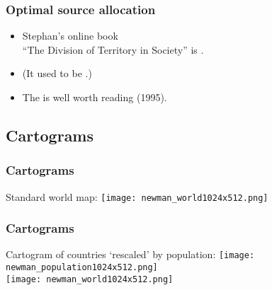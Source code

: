 \begin{frame}
  \frametitle{Optimal source allocation}

  \begin{itemize}
  \item 
    Stephan's online book\\
    \alert{``The Division of Territory in Society''}
    is
    .
  \item 
    (It used to be
    .)
  \item 
    The 
    is well worth reading (1995).
  \end{itemize}

\end{frame}

\subsection{Cartograms}

\begin{frame}
  \frametitle{Cartograms}

  Standard world map:
  \texttt{[image: newman\_world1024x512.png]}

\end{frame}

\begin{frame}
  \frametitle{Cartograms}

  Cartogram of countries `rescaled' by population:
  \texttt{[image: newman\_population1024x512.png]}\\
  \texttt{[image: newman\_world1024x512.png]}
\end{frame}

